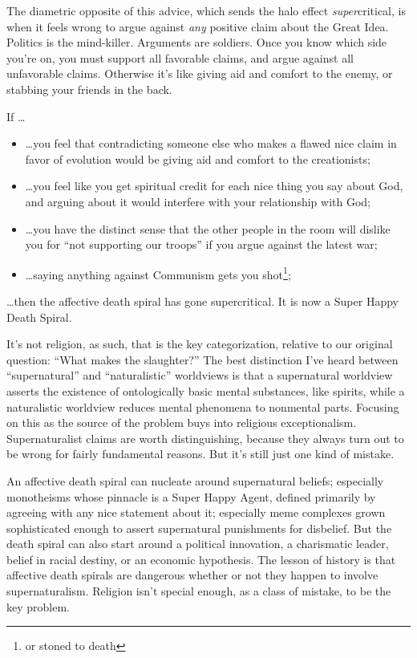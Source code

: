 {
 The diametric opposite of this advice, which sends the halo effect
\textit{super}critical, is when it feels wrong to argue against
\textit{any} positive claim about the Great Idea. Politics is the
mind-killer. Arguments are soldiers. Once you know which side
you're on, you must support all favorable claims, and
argue against all unfavorable claims. Otherwise it's
like giving aid and comfort to the enemy, or stabbing your friends in
the back.}

{
 If \ldots}

\begin{itemize}
\item {
 \ldots you feel that contradicting someone else who makes a flawed
nice claim in favor of evolution would be giving aid and comfort to the
creationists;}

\item {
 \ldots you feel like you get spiritual credit for each nice thing
you say about God, and arguing about it would interfere with your
relationship with God;}

\item {
 \ldots you have the distinct sense that the other people in the
room will dislike you for ``not supporting our
troops'' if you argue against the latest war;}

\item {
 \ldots saying anything against Communism gets you
shot\footnote{or stoned to death};} %
\end{itemize}

{
 \ldots then the affective death spiral has gone supercritical. It
is now a Super Happy Death Spiral.}

{
 It's not religion, as such, that is the key
categorization, relative to our original question:
``What makes the slaughter?'' The
best distinction I've heard between
``supernatural'' and
``naturalistic'' worldviews is that
a supernatural worldview asserts the existence of ontologically basic
mental substances, like spirits, while a naturalistic worldview reduces
mental phenomena to nonmental parts. Focusing on this as the source of
the problem buys into religious exceptionalism. Supernaturalist claims
are worth distinguishing, because they always turn out to be wrong for
fairly fundamental reasons. But it's still just one
kind of mistake.}

{
 An affective death spiral can nucleate around supernatural
beliefs; especially monotheisms whose pinnacle is a Super Happy Agent,
defined primarily by agreeing with any nice statement about it;
especially meme complexes grown sophisticated enough to assert
supernatural punishments for disbelief. But the death spiral can also
start around a political innovation, a charismatic leader, belief in
racial destiny, or an economic hypothesis. The lesson of history is
that affective death spirals are dangerous whether or not they happen
to involve supernaturalism. Religion isn't special
enough, as a class of mistake, to be the key problem.}

